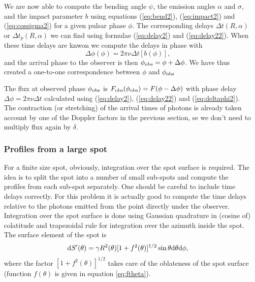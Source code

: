 \documentclass{wihuri}
\def\be{\begin{equation}}
\def\ee{\end{equation}}
\def\d{{\rm d}}
\def\phiobs{\phi_{\rm obs}}
\begin{document}
We are now able to compute the bending angle $\psi$, the emission angles $\alpha$ and $\sigma$, and the impact parameter $b$ using equations (\ref{eq:bend2}), (\ref{eq:impact2}) and (\ref{eq:cossigma2}) for a given pulsar phase $\phi$. The corresponding delays $\Delta t(R,\alpha)$ or $\Delta t_{p}(R,\alpha)$ we can find using formulae (\ref{eq:delay2}) and (\ref{eq:delay22}). When these time delays are knwon we compute the delays in phase with 
\be \label{eq:deltaphi2}
\Delta \phi(\phi) =2\pi\nu \Delta t[b(\phi)],
\ee
and the arrival phase to the observer is then $\phiobs=\phi+ \Delta\phi$. We have thus created a one-to-one correspondence between $\phi$ and $\phiobs$

The flux at observed phase $\phiobs$ is
${F}_{\rm obs}(\phiobs)=F(\phi-\Delta\phi)$ with
phase delay  $\Delta \phi=2\pi\nu\Delta t$
calculated using (\ref{eq:delay2}), (\ref{eq:delay22}) and (\ref{eq:deltaphi2}).
The contraction (or stretching) of the arrival times of photons is already taken account by one of the Doppler factors in the previous section, se we don't need to multiply flux again by $\delta$. 




\subsubsection{Profiles from a large spot} 

For a finite size spot, obviously, integration over the spot surface is required. 
The idea is to split the spot into a number of small sub-spots and compute the profiles from each sub-spot separately. One should be careful to include time delays correctly. For this problem it is actually good to compute the time delays relative to the photons emitted from the point directly under the observer. Integration over the spot surface is done using Gaussian quadrature in (cosine of) colatitude and trapezoidal rule for integration over the azimuth inside the spot. The surface element of the spot is 
\be \label{eq:surf_element}
\d S'(\theta) = \gamma R^{2}(\theta) [1+f^{2}(\theta)]^{1/2} \sin \theta \d \theta \d \phi ,
\ee
where the factor $[1+f^{2}(\theta)]^{1/2}$ takes care of the oblateness of the spot surface (function $f(\theta)$ is given in equation \ref{eq:ftheta}).
\end{document}
